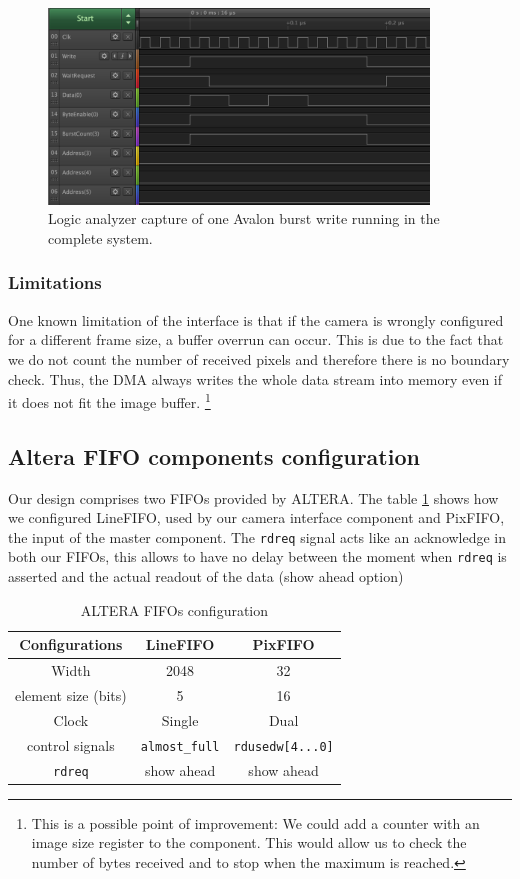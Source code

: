 \documentclass{article}
\begin{document}
\begin{figure}[H]
\centering
\includegraphics[width=0.9\textwidth]{images/avalon_burst_capture1.png}
\caption{Logic analyzer capture of one Avalon burst write running in the complete system.}
\label{fig:burst_capture}
\end{figure}

\subsubsection{Limitations}
One known limitation of the interface is that if the camera is wrongly configured for a different frame size, a buffer overrun can occur.
This is due to the fact that we do not count the number of received pixels and therefore there is no boundary check.
Thus, the DMA always writes the whole data stream into memory even if it does not fit the image buffer. \footnote{This is a possible point of improvement: We could add a counter with an image size register to the component. This would allow us to check the number of bytes received and to stop when the maximum is reached.}

\subsection{Altera FIFO components configuration}

Our design comprises two FIFOs provided by ALTERA. The table \ref{tab:fifoconf} shows how we configured LineFIFO, used by our camera interface component and PixFIFO, the input of the master component. The \verb'rdreq' signal acts like an acknowledge in both our FIFOs, this allows to have no delay between the moment when \verb'rdreq' is asserted and the actual readout of the data (show ahead option)
\begin{table}[H]
\centering
\caption{ALTERA FIFOs configuration}
\vspace{0.2 cm}
\begin{tabular}{|c|c|c|}
\hline
    Configurations & LineFIFO & PixFIFO\\
    \hline
    Width & 2048 & 32 \\
    \hline
    element size (bits) & 5 & 16\\
    \hline
    Clock  & Single & Dual \\
    \hline
    control signals & \verb'almost_full' & \verb'rdusedw[4...0]'\\
    \hline
    \verb'rdreq' & show ahead & show ahead\\
    \hline
\end{tabular}
\label{tab:fifoconf}
\end{table}
\end{document}
